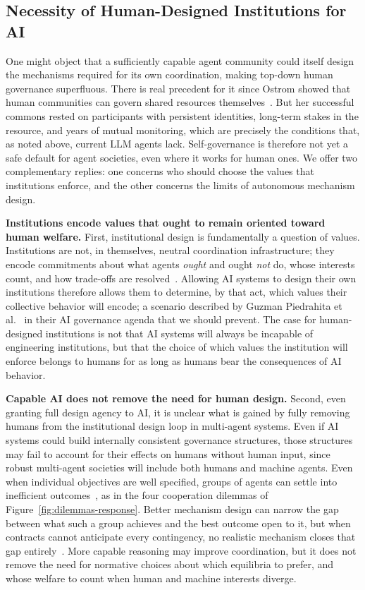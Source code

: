 \documentclass[runningheads]{llncs}
\begin{document}
\subsection{Necessity of Human-Designed Institutions for AI}\label{sec:human-designed}
One might object that a sufficiently capable agent community could itself design the mechanisms required for its own coordination, making top-down human governance superfluous. There is real precedent for it since Ostrom showed that human communities can govern shared resources themselves~\mbox{\citep{ostromGoverningCommonsEvolution1990}}. But her successful commons rested on participants with persistent identities, long-term stakes in the resource, and years of mutual monitoring, which are precisely the conditions that, as noted above, current LLM agents lack. Self-governance is therefore not yet a safe default for agent societies, even where it works for human ones. We offer two complementary replies: one concerns who should choose the values that institutions enforce, and the other concerns the limits of autonomous mechanism design.

\textbf{Institutions encode values that ought to remain oriented toward human welfare.} First, institutional design is fundamentally a question of values. Institutions are not, in themselves, neutral coordination infrastructure; they encode commitments about what agents \emph{ought} and ought \emph{not} do, whose interests count, and how trade-offs are resolved~\citep{northInstitutionsInstitutionalChange1990}. Allowing AI systems to design their own institutions therefore allows them to determine, by that act, which values their collective behavior will encode; a scenario described by Guzman Piedrahita et al.~\citep{guzmanpiedrahita2026aiposes} in their AI governance agenda that we should prevent. The case for human-designed institutions is not that AI systems will always be incapable of engineering institutions, but that the choice of which values the institution will enforce belongs to humans for as long as humans bear the consequences of AI behavior.

\textbf{Capable AI does not remove the need for human design.} Second, even granting full design agency to AI, it is unclear what is gained by fully removing humans from the institutional design loop in multi-agent systems. Even if AI systems could build internally consistent governance structures, those structures may fail to account for their effects on humans without human input, since robust multi-agent societies will include both humans and machine agents. Even when individual objectives are well specified, groups of agents can settle into inefficient outcomes~\mbox{\citep{hardinTragedyCommons1968}}, as in the four cooperation dilemmas of Figure~\mbox{\ref{fig:dilemmas-response}}. Better mechanism design can narrow the gap between what such a group achieves and the best outcome open to it, but when contracts cannot anticipate every contingency, no realistic mechanism closes that gap entirely~\mbox{\citep{huang2026mechanismdesignenoughprosocial}}. More capable reasoning may improve coordination, but it does not remove the need for normative choices about which equilibria to prefer, and whose welfare to count when human and machine interests diverge.
\end{document}
